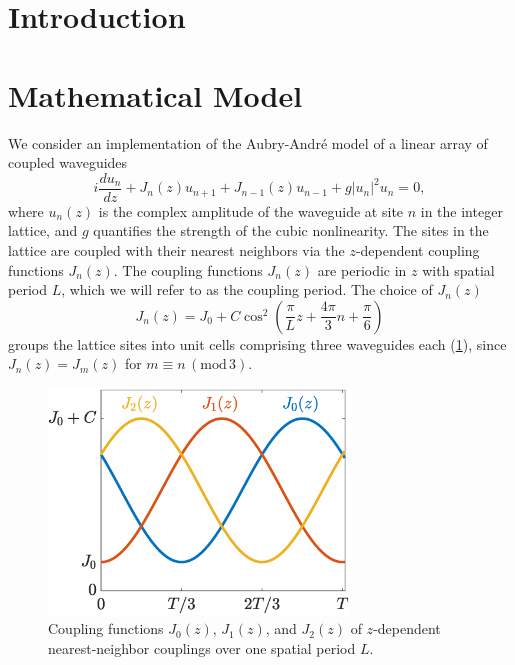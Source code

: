 \documentclass[reprint, amsmath,amssymb,aps,pre]{revtex4-2}
\begin{document}
\section{Introduction}

\section{Mathematical Model}

We consider an implementation of the Aubry-Andr\'e model \cite{Aubry1980} of a linear array of coupled waveguides
\begin{equation}\label{eq:model}
i \frac{d u_n}{d z} + J_n(z) u_{n+1} + J_{n-1}(z)u_{n-1} + g|u_n|^2 u_n = 0,
\end{equation}
where $u_n(z)$ is the complex amplitude of the waveguide at site $n$ in the integer lattice, and $g$ quantifies the strength of the cubic nonlinearity. The sites in the lattice are coupled with their nearest neighbors via the $z$-dependent coupling functions $J_n(z)$. The coupling functions $J_n(z)$ are periodic in $z$ with spatial period $L$, which we will refer to as the coupling period. The choice of $J_n(z)$
\begin{equation}\label{eq:Jn}
J_n(z) = J_0 + C \cos^2\left( \frac{\pi}{L}z + \frac{4 \pi}{3} n + \frac{\pi}{6} \right)
\end{equation}
groups the lattice sites into unit cells comprising three waveguides each (\cref{fig:J}), since $J_n(z) = J_m(z)$ for $m \equiv n\,(\text{mod}\,3)$.

\begin{figure}
    \centering
    \includegraphics[width=8cm]{J.eps}
    \caption{Coupling functions $J_0(z)$, $J_1(z)$, and $J_2(z)$ of $z$-dependent nearest-neighbor couplings over one spatial period $L$.}
    \label{fig:J}
\end{figure}
\end{document}
